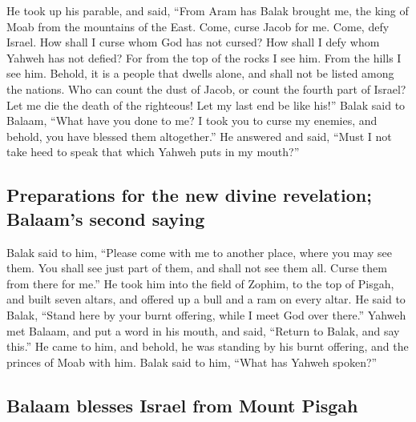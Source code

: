  He took up his parable, and said, ``From Aram has Balak
brought me, the king of Moab from the mountains of the East. Come, curse
Jacob for me. Come, defy Israel.  How shall I curse whom
God has not cursed? How shall I defy whom Yahweh has not defied?
 For from the top of the rocks I see him. From the hills I
see him. Behold, it is a people that dwells alone, and shall not be
listed among the nations.  Who can count the dust of
Jacob, or count the fourth part of Israel? Let me die the death of the
righteous! Let my last end be like his!''  Balak said to
Balaam, ``What have you done to me? I took you to curse my enemies, and
behold, you have blessed them altogether.''  He answered
and said, ``Must I not take heed to speak that which Yahweh puts in my
mouth?''

\hypertarget{preparations-for-the-new-divine-revelation-balaams-second-saying}{%
\subsection{Preparations for the new divine revelation; Balaam's second
saying}\label{preparations-for-the-new-divine-revelation-balaams-second-saying}}

 Balak said to him, ``Please come with me to another
place, where you may see them. You shall see just part of them, and
shall not see them all. Curse them from there for me.'' 
He took him into the field of Zophim, to the top of Pisgah, and built
seven altars, and offered up a bull and a ram on every altar.
 He said to Balak, ``Stand here by your burnt offering,
while I meet God over there.''  Yahweh met Balaam, and
put a word in his mouth, and said, ``Return to Balak, and say this.''
 He came to him, and behold, he was standing by his burnt
offering, and the princes of Moab with him. Balak said to him, ``What
has Yahweh spoken?''

\hypertarget{balaam-blesses-israel-from-mount-pisgah}{%
\subsection{Balaam blesses Israel from Mount
Pisgah}\label{balaam-blesses-israel-from-mount-pisgah}}

